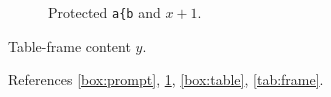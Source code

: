 \documentclass{article}
\begin{document}
\begin{figure}
\cprotect\caption{Protected \verb|a{b| and $x+1$.}\label{fig:prompt}
\end{figure}
\begin{table}\begin{tcolorbox}[label=box:table]Table-frame content $y$.\end{tcolorbox}\caption{Table frame.}\label{tab:frame}\end{table}
References \ref{box:prompt}, \ref{fig:prompt}, \ref{box:table}, \ref{tab:frame}.
\end{document}

